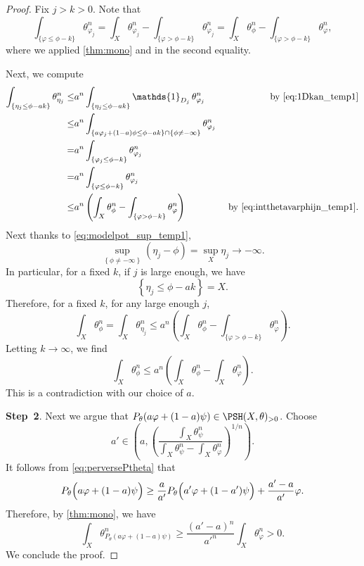 \begin{proof}
    Fix $j>k>0$. Note that
    \begin{equation}\label{eq:intthetavarphijn_temp1}
    \int_{\{\varphi\leq \phi-k \}} \theta_{\varphi_j}^n=\int_X \theta_{\varphi_j}^n-\int_{\{\varphi>\phi-k \}} \theta_{\varphi_j}^n=\int_X \theta_{\phi}^n-\int_{\{\varphi>\phi-k \}} \theta_{\varphi}^n,
    \end{equation}
    where we applied \cref{thm:mono} and  in the second equality.

    Next, we compute
    \[
    \begin{aligned}
        \int_{\left\{ \eta_j\leq \phi-ak \right\}} \theta_{\eta_j}^n\leq & a^n  \int_{\left\{ \eta_j\leq \phi-ak \right\}} \mathds{1}_{D_j}\, \theta_{\varphi_j}^n & \textup{by \eqref{eq:1Dkan_temp1}}\\
        \leq & a^n \int_{\left\{ a\varphi_j+(1-a)\phi\leq \phi-ak \right\}\cap \left\{\phi\neq -\infty\right\} } \theta_{\varphi_j}^n\\
        = & a^n \int_{\left\{ \varphi_j\leq \phi-k \right\}} \theta_{\varphi_j}^n\\
        = & a^n \int_{\left\{ \varphi\leq \phi-k \right\}} \theta_{\varphi_j}^n\\
        \leq & a^n\left( \int_X \theta_{\phi}^n- \int_{\left\{\varphi>\phi-k \right\}} \theta_{\varphi}^n \right)&\textup{ by \eqref{eq:intthetavarphijn_temp1}}.
    \end{aligned}
    \]
    Next thanks to \eqref{eq:modelpot_sup_temp1},
    \[
    \sup_{ \left\{\phi\neq -\infty \right\} } \left(\eta_j-\phi \right)=\sup_X \eta_j\to -\infty.
    \]
    In particular, for a fixed $k$, if $j$ is large enough, we have
    \[
    \left\{\eta_j\leq \phi-ak \right\}=X.
    \]
    Therefore, for a fixed $k$, for any large enough $j$,
    \[
    \int_X \theta_{\phi}^n=\int_X \theta_{\eta_j}^n\leq a^n\left( \int_X \theta_{\phi}^n- \int_{\{\varphi>\phi-k\}} \theta_{\varphi}^n\right).
    \]
    Letting $k\to\infty$, we find
    \[
    \int_X \theta_{\phi}^n\leq a^n \left(\int_X \theta_{\phi}^n-\int_X \theta_{\varphi}^n \right).
    \]
    This is a contradiction with our choice of $a$.


    \textbf{Step~2}.
    Next we argue that $P_{\theta}(a\varphi+(1-a)\psi)\in \PSH(X,\theta)_{>0}$. Choose
    \[
        a'\in \left( a, \left(\frac{\int_X \theta_{\psi}^n}{\int_X \theta_{\psi}^n-\int_X \theta_{\varphi}^n}\right)^{1/n} \right).
    \]
    It follows from \eqref{eq:perversePtheta} that
    \begin{equation}\label{eq:Pthetalowerbdtemp1}
        P_{\theta}\Bigl(a\varphi+(1-a)\psi \Bigr)\geq \frac{a}{a'} P_{\theta}\Bigl(a'\varphi+(1-a')\psi \Bigr)+\frac{a'-a}{a'}\varphi.
    \end{equation}
    Therefore, by \cref{thm:mono}, we have
    \begin{equation}\label{eq:Pthetalowerbdtemp2}
        \int_X \theta_{P_{\theta}\left(a\varphi+(1-a)\psi\right)}^n\geq \frac{(a'-a)^n}{a'^n}\int_X \theta_{\varphi}^n>0.
    \end{equation}
    We conclude the proof.
\end{proof}


